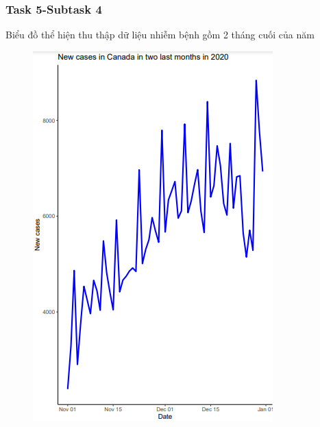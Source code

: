 \documentclass[english,10pt,table]{beamer}
\begin{document}
{
    \frametitle{Task 5-Subtask 4}
    \begin{block}{Biểu đồ thể hiện thu thập dữ liệu nhiễm bệnh gồm 2 tháng cuối của năm}
    \begin{figure}[H]
		\centering
		\includegraphics[scale=0.5]{images/5.4.1.png}
	\end{figure}
    \end{block}
}
\frame
\end{document}
